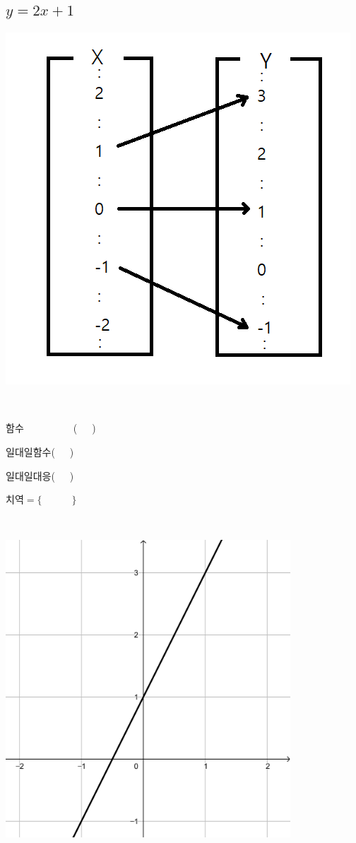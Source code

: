 \documentclass[a4paper]{oblivoir}
\begin{document}
\clearpage

\subsection{\(y=2x+1\)}
%
\begin{minipage}{0.4\textwidth}
\includegraphics[width=\textwidth]{y=2x+1}
\end{minipage}
~
\begin{minipage}{0.20\textwidth}
함수~~~~~~~~~~(~~~)\par\bigskip
일대일함수(~~~)\par\bigskip
일대일대응(~~~)\par\bigskip
치역\(=\{\qquad\quad\}\)
\end{minipage}
~
\begin{minipage}{0.35\textwidth}
\includegraphics[width=0.8\textwidth]{y=2x+1-}
\end{minipage}
\end{document}
